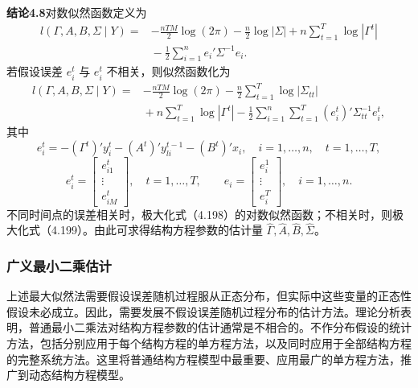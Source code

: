 \par\medskip\noindent\textbf{结论4.8}\quad 对数似然函数定义为
\begin{equation}
\begin{aligned}
l(\Gamma,A,B,\Sigma\mid Y)
={}&-\frac{nTM}{2}\log(2\pi)-\frac n2\log|\Sigma|
  +n\sum_{t=1}^{T}\log|\Gamma^t|\\
 &{}-\frac12\sum_{i=1}^{n}e_i'\Sigma^{-1}e_i.
\end{aligned}\tag{4.198}
\end{equation}
若假设误差 $e_i^t$ 与 $e_i^t$ 不相关，则似然函数化为
\begin{equation}
\begin{aligned}
l(\Gamma,A,B,\Sigma\mid Y)
={}&-\frac{nTM}{2}\log(2\pi)-\frac n2\sum_{t=1}^{T}\log|\Sigma_{tt}|\\
 &{}+n\sum_{t=1}^{T}\log|\Gamma^t|
 -\frac12\sum_{i=1}^{n}\sum_{t=1}^{T}(e_i^t)'\Sigma_{tt}^{-1}e_i^t,
\end{aligned}\tag{4.199}
\end{equation}
其中
\[
e_i^t=-(\Gamma^t)'y_i^t-(A^t)'y_{li}^{t-1}-(B^t)'x_i,
\quad i=1,\ldots,n,\quad t=1,\ldots,T,
\]
\[
e_i^t=\begin{bmatrix}e_{i1}^t\\\vdots\\e_{iM}^t\end{bmatrix},
\quad t=1,\ldots,T,\qquad
e_i=\begin{bmatrix}e_i^1\\\vdots\\e_i^T\end{bmatrix},
\quad i=1,\ldots,n.
\]
不同时间点的误差相关时，极大化式（4.198）的对数似然函数；不相关时，则极大化式（4.199）。由此可求得结构方程参数的估计量 $\widehat\Gamma,\widehat A,\widehat B,\widehat\Sigma$。

\subsubsection{广义最小二乘估计}

上述最大似然法需要假设误差随机过程服从正态分布，但实际中这些变量的正态性假设未必成立。因此，需要发展不假设误差随机过程分布的估计方法。理论分析表明，普通最小二乘法对结构方程参数的估计通常是不相合的。不作分布假设的统计方法，包括分别应用于每个结构方程的单方程方法，以及同时应用于全部结构方程的完整系统方法。这里将普通结构方程模型中最重要、应用最广的单方程方法，推广到动态结构方程模型。

